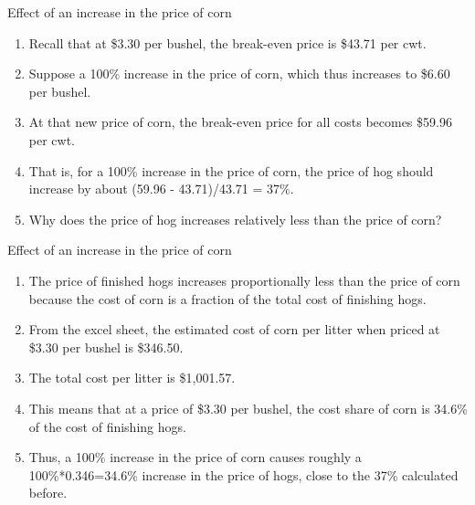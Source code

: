 \documentclass[table,xcolor=pdftex,dvipsnames, handout]{beamer}\usepackage[]{graphicx}\usepackage[]{color}
\begin{document}

\begin{frame}{Effect of an increase in the price of corn}
\begin{enumerate}[label=\textbullet]
  \item Recall that at \$3.30 per bushel, the break-even price is \$43.71 per cwt.
  \item Suppose a 100\% increase in the price of corn, which thus increases to \$6.60 per bushel.
  \item At that new price of corn, the break-even price for all costs becomes \$59.96 per cwt.
  \item That is, for a 100\% increase in the price of corn, the price of hog should increase by about (59.96 - 43.71)/43.71 = 37\%.
  \item Why does the price of hog increases relatively less than the price of corn?
\end{enumerate}
\end{frame}



\begin{frame}{Effect of an increase in the price of corn}
\begin{enumerate}[label=\textbullet]
  \item The price of finished hogs increases proportionally less than the price of corn because the cost of corn is a fraction of the total cost of finishing hogs.
  \item From the excel sheet, the estimated cost of corn per litter when priced at \$3.30 per bushel is \$346.50.
  \item The total cost per litter is \$1,001.57.
  \item This means that at a price of \$3.30 per bushel, the cost share of corn is 34.6\% of the cost of finishing hogs.
  \item Thus, a 100\% increase in the price of corn causes roughly a 100\%*0.346=34.6\% increase in the price of hogs, close to the 37\% calculated before.
\end{enumerate}
\end{frame}

\end{document}
